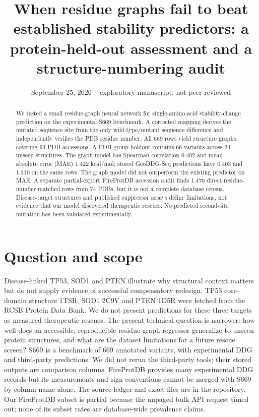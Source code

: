 \documentclass[11pt]{article}
\title{When residue graphs fail to beat established stability predictors: a protein-held-out assessment and a structure-numbering audit}
\author{}
\date{September 25, 2026 -- exploratory manuscript, not peer reviewed}
\begin{document}
\renewcommand{\arraystretch}{0.84}
\maketitle
\begin{abstract}
We tested a small residue-graph neural network for single-amino-acid stability-change prediction on the experimental S669 benchmark. A corrected mapping derives the mutated sequence site from the only wild-type/mutant sequence difference and independently verifies the PDB residue number. All 669 rows yield structure graphs, covering 94 PDB accessions. A PDB-group holdout contains 66 variants across 24 unseen structures. The graph model has Spearman correlation 0.402 and mean absolute error (MAE) 1.422 kcal/mol; stored GeoDDG-Seq predictions have 0.403 and 1.310 on the same rows. The graph model did not outperform the existing predictor on MAE. A separate partial-export FireProtDB accession audit finds 1,470 direct residue-number-matched rows from 74 PDBs, but it is not a complete database census. Disease-target structures and published suppressor assays define limitations, not evidence that our model discovered therapeutic rescues. No predicted second-site mutation has been validated experimentally.
\end{abstract}
\section{Question and scope}
Disease-linked TP53, SOD1 and PTEN illustrate why structural context matters but do not supply evidence of successful compensatory redesign. TP53 core-domain structure 1TSR, SOD1 2C9V and PTEN 1D5R were fetched from the RCSB Protein Data Bank. We do not present predictions for these three targets as measured therapeutic rescues. The present technical question is narrower: how well does an accessible, reproducible residue-graph regressor generalize to unseen protein structures, and what are the dataset limitations for a future rescue screen? S669 is a benchmark of 669 annotated variants, with experimental DDG and third-party predictions. We did not rerun the third-party tools; their stored outputs are comparison columns. FireProtDB provides many experimental DDG records but its measurements and sign conventions cannot be merged with S669 by column name alone. The source ledger and exact files are in the repository. Our FireProtDB subset is partial because the unpaged bulk API request timed out; none of its subset rates are database-wide prevalence claims.
\end{document}
